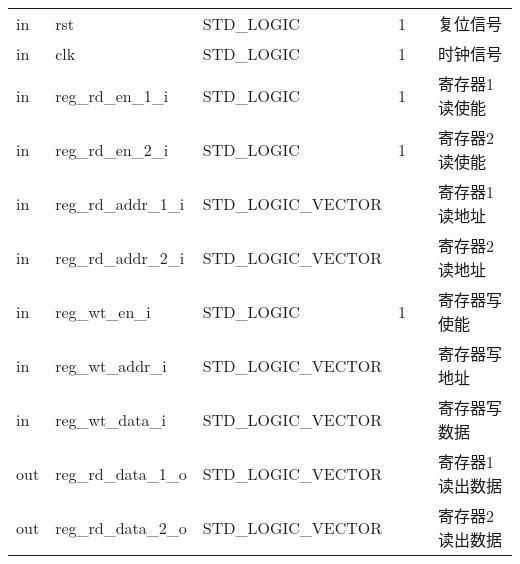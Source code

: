 \documentclass{article}
\begin{document}
\begin{center}




    \tablelasttail{\bottomrule}

    \small
    \begin{supertabular}{lllllp{2cm}}

    in & rst\label{REGISTERS:rst} & STD_LOGIC & 1 &  & 复位信号    \\
    in & clk\label{REGISTERS:clk} & STD_LOGIC & 1 &  & 时钟信号    \\
    in & reg_rd_en_1_i\label{REGISTERS:reg_rd_en_1_i} & STD_LOGIC & 1 &  & 寄存器1读使能 \\
    in & reg_rd_en_2_i\label{REGISTERS:reg_rd_en_2_i} & STD_LOGIC & 1 &  & 寄存器2读使能 \\
    in & reg_rd_addr_1_i\label{REGISTERS:reg_rd_addr_1_i} & STD_LOGIC_VECTOR &  &  & 寄存器1读地址 \\
    in & reg_rd_addr_2_i\label{REGISTERS:reg_rd_addr_2_i} & STD_LOGIC_VECTOR &  &  & 寄存器2读地址 \\
    in & reg_wt_en_i\label{REGISTERS:reg_wt_en_i} & STD_LOGIC & 1 &  & 寄存器写使能 \\
    in & reg_wt_addr_i\label{REGISTERS:reg_wt_addr_i} & STD_LOGIC_VECTOR &  &  & 寄存器写地址 \\
    in & reg_wt_data_i\label{REGISTERS:reg_wt_data_i} & STD_LOGIC_VECTOR &  &  & 寄存器写数据 \\
    out & reg_rd_data_1_o\label{REGISTERS:reg_rd_data_1_o} & STD_LOGIC_VECTOR &  &  & 寄存器1读出数据 \\
    out & reg_rd_data_2_o\label{REGISTERS:reg_rd_data_2_o} & STD_LOGIC_VECTOR &  &  & 寄存器2读出数据 \\

    \end{supertabular}
\end{center}
\FloatBarrier
\end{document}
